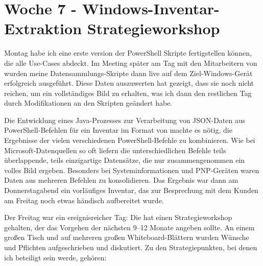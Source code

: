 \section{Woche 7 - Windows-Inventar-Extraktion \headerand Strategieworkshop} \label{sec:bericht-wo-7}


\lweekdaymarginpar{\weekdayMondayShort, \weekdayTuesdayShort}

Montag habe ich eine erste version der PowerShell Skripte fertigstellen können, die alle Use-Cases abdeckt.
Im Meeting später am Tag mit den Mitarbeitern von {\aeclientZEZESE} wurden meine Datensammlungs-Skripte dann live auf dem Ziel-Windows-Gerät erfolgreich ausgeführt.
Diese Daten auszuwerten hat gezeigt, dass sie noch nicht reichen, um ein vollständiges Bild zu erhalten, was ich dann den restlichen Tag durch Modifikationen an den Skripten geändert habe.

\sweekdaymarginpar{\weekdayWednesdayShort, \weekdayThursdayShort}

Die Entwicklung eines Java-Prozesses zur Verarbeitung von JSON-Daten aus PowerShell-Befehlen für ein Inventar im Format von {\metaeffekt} machte es nötig, die Ergebnisse der vielen verschiedenen PowerShell-Befehle zu kombinieren.
Wie bei Microsoft-Datenquellen so oft liefern die unterschiedlichen Befehle teils überlappende, teils einzigartige Datensätze, die nur zusammengenommen ein volles Bild ergeben.
Besonders bei Systeminformationen und PNP-Geräten waren Daten aus mehreren Befehlen zu konsolidieren.
Das Ergebnis war dann am Donnerstagabend ein vorläufiges Inventar, das zur Besprechung mit dem Kunden am Freitag noch etwas händisch aufbereitet wurde.

\sweekdaymarginpar{\weekdayFridayLong}

Der Freitag war ein ereignisreicher Tag:
Die {\metaeffekt} hat einen Strategieworkshop gehalten, der das Vorgehen der nächsten 9--12 Monate angeben sollte.
An einem großen Tisch und auf mehreren großen Whiteboard-Blättern wurden Wünsche und Pflichten aufgeschrieben und diskutiert.
Zu den Strategiepunkten, bei denen ich beteiligt sein werde, gehören:

